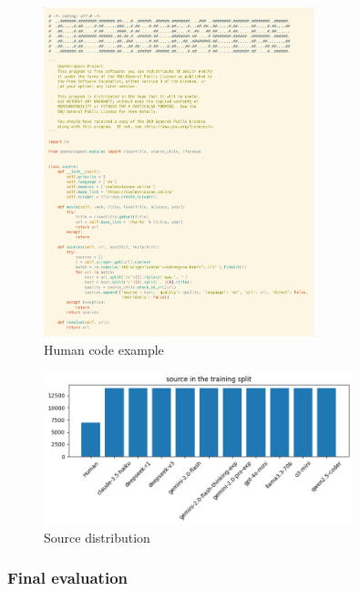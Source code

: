 \begin{figure}[H]
    \centering
    \includegraphics[width=0.7\textwidth]{img/CodeMirage/code example.png}
    \caption{Human code example}
    \label{fig:code_example}
\end{figure}


\begin{figure}[H]
    \centering
    \includegraphics[width=0.8\textwidth]{img/CodeMirage/source.png}
    \caption{Source distribution}
    \label{fig:distribution}
\end{figure}

\subsubsection*{Final evaluation}


